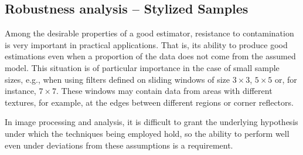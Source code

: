 \documentclass[twocolumn]{svjour3}
\newcommand{\at}[2][]{#1|_{#2}}
\begin{document}
	
%	
%	

%	
	
	\subsection{Robustness analysis -- Stylized Samples}
	\label{robustez}
	Among the desirable properties of a good estimator, resistance to contamination is very important in practical applications. That is, its ability to produce good estimations even when a proportion of the data does not come from the assumed model. 
	This situation is of particular importance in the case of small sample sizes, e.g., when using filters defined on sliding windows of size $3 \times 3$, $5 \times 5$ or, for instance, $7 \times 7$. 
	These windows may contain data from areas with different textures, for example, at the edges between different regions or corner reflectors.
	
	In image processing and analysis, it is difficult to grant the underlying hypothesis under which the techniques being employed hold, so the ability to perform well even under deviations from these assumptions is a requirement.
	
\end{document}
